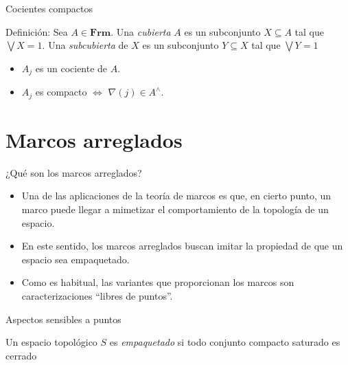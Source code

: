 \documentclass[compress,12pt]{beamer}
\begin{document}
\begin{frame}{Cocientes compactos}
\begin{block}{Definición:}
Sea $A\in \mathbf{Frm}$. Una \emph{cubierta} $A$ es un subconjunto $X\subseteq A$ tal que $\bigvee X=1$. Una \emph{subcubierta} de $X$ es un subconjunto $Y\subseteq X$ tal que $\bigvee Y=1$
\end{block}

\begin{itemize}
    \item<3-> $A_j$ es un cociente de $A$.
    \item<4-> $A_j$ es compacto $\Leftrightarrow$ $\nabla(j)\in A^\wedge$.
\end{itemize}
\end{frame}

\section{Marcos arreglados}
\begin{frame}{¿Qué son los marcos arreglados?}
    \begin{itemize}

    \item Una de las aplicaciones de la teoría de marcos es que, en cierto punto, un marco puede llegar a mimetizar el comportamiento de la topología de un espacio.\\

    \item<2-> En este sentido, los marcos arreglados buscan imitar la propiedad de que un espacio sea empaquetado.\\

    \item<3-> Como es habitual, las variantes que proporcionan los marcos son caracterizaciones ``libres de puntos''.
    \end{itemize}
\end{frame}

\begin{frame}{Aspectos sensibles a puntos}
    \begin{definition}
        Un espacio topológico $S$ es \emph{empaquetado} si todo conjunto compacto saturado es cerrado
    \end{definition}


\end{frame}
\end{document}
